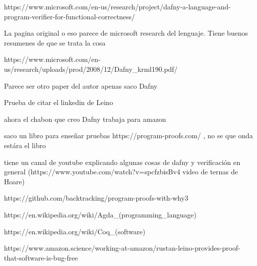 \documentclass[runningheads]{llncs}
\begin{document}
https://www.microsoft.com/en-us/research/project/dafny-a-language-and-program-verifier-for-functional-correctness/

La pagina original o eso parece de microsoft research del lenguaje. Tiene buenos resumenes de que se trata la cosa

https://www.microsoft.com/en-us/research/uploads/prod/2008/12/Dafny\_krml190.pdf/

Parece ser otro paper del autor apenas saco Dafny

 Prueba de citar el linkedin de Leino\cite{linkedinLeino}

ahora el chabon que creo Dafny trabaja para amazon

saco un libro para enseñar pruebas https://program-proofs.com/ , no se que onda estára el libro

tiene un canal de youtube explicando algunas cosas de dafny y verificación en general (https://www.youtube.com/watch?v=spcfzbisBv4 video de ternas de Hoare)

https://github.com/backtracking/program-proofs-with-why3

https://en.wikipedia.org/wiki/Agda\_(programming\_language)

https://en.wikipedia.org/wiki/Coq\_(software)

https://www.amazon.science/working-at-amazon/rustan-leino-provides-proof-that-software-is-bug-free


\end{document}
